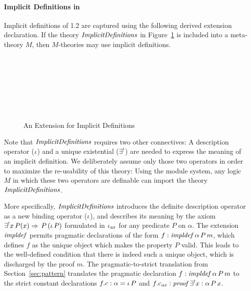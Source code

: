 \paragraph{Implicit Definitions in {\omdoc}}
Implicit definitions of {\omdoc} 1.2 are captured using the following derived extension declaration.
If the theory $\mathit{ImplicitDefinitions}$ in Figure~\ref{fig:impldef} is included into a meta-theory $M$, then $M$-theories may use implicit definitions.

\begin{figure}[ht]
\vspace{-1.5em}
\begin{center}
\begin{twelfsig}
\tsig{\Description}\\
\tmeta{\Forms}{}\\
\decl{\uexists}{(\alpha\to\form)\to\form}\\
\decl{\descr}{(\alpha\to\form)\to\alpha}\\
\\
[.5em]
\\
\tsigend
\end{twelfsig}
\end{center}
\vspace{-2em}
\caption{An Extension for Implicit Definitions}\label{fig:impldef}
\vspace{-1em}
\end{figure}

Note that $\mathit{ImplicitDefinitions}$ requires two other connectives: A description operator ($\iota$) and a unique existential ($\exists^{!}$) are needed to express the meaning of an implicit definition.
We deliberately assume only those two operators in order to maximize the re-usability of this theory: Using the {\mmt} module system, any logic $M$ in which these two operators are definable can import the theory $\mathit{ImplicitDefinitions}$.

More specifically, $\mathit{ImplicitDefinitions}$ introduces the definite description operator as a new
binding operator ($\iota$), and describes its meaning by the axiom $\exists^{!}
x\,P(x)\Rightarrow\,P\,(\iota\,P)$ formulated in $\iota_{\mathit{ax}}$ for any predicate $P$ on $\alpha$.
The extension $\mathit{impldef}$ permits pragmatic declarations of the form $f:
\mathit{impldef}\,\alpha\,P\,m$, which defines $f$ as the unique object which makes the property
$P$ valid. This leads to the well-defined condition that there is indeed such a unique
object, which is discharged by the proof $m$.  The pragmatic-to-strict translation from
Section~\ref{sec:pattern} translates the pragmatic declaration $f: \mathit{impldef}\,\alpha\,P\,m$
to the strict constant declarations $f.c : \alpha = \iota\,P$ and $f.c_{\mathit{ax}} :
\mathit{proof}\,\exists^{!} x:\alpha\,P\,x$.



